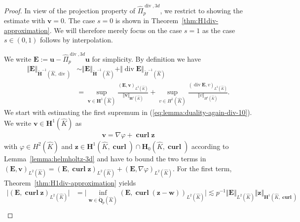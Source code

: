 \documentclass{article}
\newcommand{\hatPidivcom}{\widehat\Pi^{\operatorname*{div},3d}_{p}}
\begin{document}
\begin{proof}
In view of the projection property of $\hatPidivcom$, we restrict to showing the estimate with ${\mathbf v} = 0$. 
The case $s = 0$ is shown in Theorem~\ref{thm:H1div-approximation}. We will therefore merely focus 
on the case $s = 1$ as the case $s \in (0,1)$ follows by interpolation. 

We write $\mathbf{E}:=\mathbf{u}-\hatPidivcom\mathbf{u}$ for simplicity. 
By definition we have
\begin{align}
\label{eq:lemma:duality-again-div-10}
\Vert\mathbf{E}\Vert_{\widetilde{\mathbf{H}}^{-1}(\widehat{K},\operatorname{div})} &\sim 
\Vert\mathbf{E}\Vert_{\widetilde{\mathbf{H}}^{-1}(\widehat{K})} + \Vert\operatorname{div}\mathbf{E}\Vert_{\widetilde{H}^{-1}(\widehat{K})} 
\\ 
\nonumber 
&= 
\operatorname*{sup}_{\mathbf{v}\in\mathbf{H}^1(\widehat{K})} \frac{(\mathbf{E},\mathbf{v})_{L^2(\widehat{K})}}{\Vert\mathbf{v}\Vert_{\mathbf{H}^1(\widehat{K})}} + 
\operatorname*{sup}_{{v}\in{H}^1(\widehat{K})} \frac{(\operatorname{div} \mathbf{E},{v})_{L^2(\widehat{K})}}{\Vert{v}\Vert_{{H}^1(\widehat{K})}}.
\end{align}
We start with estimating the first supremum in (\ref{eq:lemma:duality-again-div-10}). 
We write $\mathbf{v}\in\mathbf{H}^1(\widehat{K})$ as
\begin{align*}
\mathbf{v}=\nabla\varphi + \operatorname{\mathbf{curl}}\mathbf{z}
\end{align*}
with $\varphi\in H^2(\widehat{K})$ and $\mathbf{z}\in\mathbf{H}^1(\widehat{K},\operatorname{\mathbf{curl}}) \cap \mathbf{H}_0(\widehat{K},\operatorname{\mathbf{curl}})$ according to Lemma~\ref{lemma:helmholtz-3d}
and have to bound the two terms in $(\mathbf{E},\mathbf{v})_{L^2(\widehat{K})} = (\mathbf{E},\operatorname{\mathbf{curl}}\mathbf{z})_{L^2(\widehat{K})} + (\mathbf{E},\nabla\varphi)_{L^2(\widehat{K})}$. For the first term, 
Theorem~\ref{thm:H1div-approximation} yields 
\begin{align*}
\bigl|(\mathbf{E},\operatorname{\mathbf{curl}}\mathbf{z})_{L^2(\widehat{K})}\bigr| 
&= \bigl|\operatorname*{inf}_{\mathbf{w}\in\mathring{\mathbf{Q}}_p(\widehat{K})} (\mathbf{E},\operatorname{\mathbf{curl}}(\mathbf{z}-\mathbf{w}))_{L^2(\widehat{K})} \bigr| \lesssim p^{-1} \Vert\mathbf{E}\Vert_{L^2(\widehat{K})} \Vert\mathbf{z}\Vert_{\mathbf{H}^1(\widehat{K},\operatorname{\mathbf{curl}})} \\

\end{align*}
\end{proof}
\end{document}
